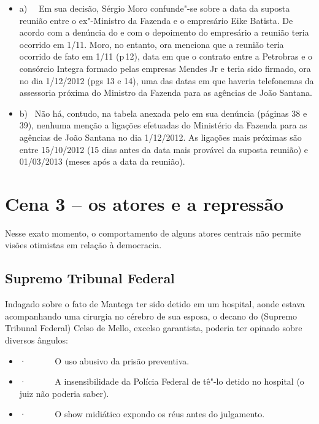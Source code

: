 \begin{itemize}
\itemsep1pt\parskip0pt
\item
  a)~~ Em sua decisão, Sérgio Moro confunde"-se sobre a data da suposta
  reunião entre o ex"-Ministro da Fazenda e o empresário Eike Batista. De
  acordo com a denúncia do  e com o depoimento do empresário a
  reunião teria ocorrido em 1/\allowbreak{}11. Moro, no entanto, ora menciona que a
  reunião teria ocorrido de fato em 1/\allowbreak{}11 (p\,12), data em que o
  contrato entre a Petrobras e o consórcio Integra formado pelas
  empresas Mendes Jr e  teria sido firmado, ora no dia 1/\allowbreak{}12/\allowbreak{}2012 (pgs
  13 e 14), uma das datas em que haveria telefonemas da assessoria
  próxima do Ministro da Fazenda para as agências de João Santana.
\item
  b)~ Não há, contudo, na tabela anexada pelo  em sua denúncia
  (páginas 38 e 39), nenhuma menção a ligações efetuadas do Ministério
  da Fazenda para as agências de João Santana no dia 1/\allowbreak{}12/\allowbreak{}2012. As
  ligações mais próximas são entre 15/\allowbreak{}10/\allowbreak{}2012 (15 dias antes da data
  mais provável da suposta reunião) e 01/\allowbreak{}03/\allowbreak{}2013 (meses após a data da
  reunião).
\end{itemize}

\section{Cena 3 -- os atores e a repressão}

Nesse exato momento, o comportamento de alguns atores centrais não
permite visões otimistas em relação à democracia.

\subsection{Supremo Tribunal Federal}

 Indagado sobre o fato de Mantega ter sido detido em um hospital, aonde
estava acompanhando uma cirurgia no cérebro de sua esposa, o decano do
 (Supremo Tribunal Federal) Celso de Mello, excelso garantista,
poderia ter opinado sobre diversos ângulos:

\begin{itemize}
\itemsep1pt\parskip0pt
\item
  ·~~~~~~ O uso abusivo da prisão preventiva.
\item
  ·~~~~~~ A insensibilidade da Polícia Federal de tê"-lo detido no
  hospital (o juiz não poderia saber).
\item
  ·~~~~~~ O show midiático expondo os réus antes do julgamento.
\end{itemize}

